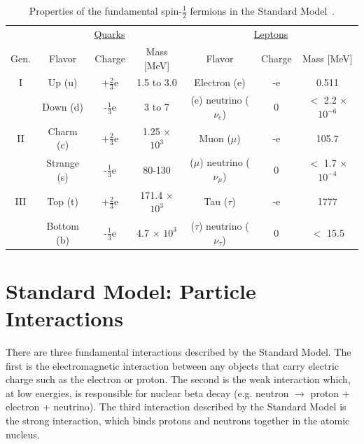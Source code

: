 \begin{table}[!h!tbp]
\begin{center}
\caption{Properties of the fundamental spin-$\frac{1}{2}$ fermions in the Standard Model~\cite{Yao:2006px}.}
\begin{tabular}{c|ccc|ccc}
& \multicolumn{3}{c|}{\underline{Quarks}}
& \multicolumn{3}{c}{\underline{Leptons}} \\
Gen.	&	Flavor	&	Charge	&	Mass [MeV]				&	Flavor					&	Charge	&	Mass [MeV]	\\
\hline
I	&	Up (u)		&	+$\frac{2}{3}$e	&	1.5 to 3.0					&	Electron (e)				&	-e		&	0.511	\\
	&	Down (d)		&	-$\frac{1}{3}$e	&	3 to 7					&	(e) neutrino ($\nu_{e}$)	&	0		&	$<$ 2.2 $\times$ $10^{-6}$	\\
\hline
II	&	Charm (c)		&	+$\frac{2}{3}$e	&	1.25 $\times$ $10^{3}$		&	Muon ($\mu$)				&	-e		&	105.7	\\
	&	Strange (s)	&	-$\frac{1}{3}$e	&	80-130					&	($\mu$) neutrino ($\nu_{\mu}$)	&	0		&	$<$ 1.7 $\times$ $10^{-4}$	\\
\hline
III	&	Top (t)		&	+$\frac{2}{3}$e	&	171.4 $\times$ $10^{3}$		&	Tau ($\tau$)				&	-e		&	1777		\\
	&	Bottom (b)		&	-$\frac{1}{3}$e	&	4.7 $\times$ $10^{3}$		&	($\tau$) neutrino ($\nu_{\tau}$)	&	0		&	$<$ 15.5	\\
\end{tabular}
\vspace{-0.1 in}
\label{fermions}
\end{center}
\end{table}

\section{Standard Model: Particle Interactions}
\label{interaction}

There are three fundamental interactions described by the Standard Model. The first is the electromagnetic interaction between any objects that carry electric charge such as the electron or proton. The second is the weak interaction which, at low energies, is responsible for nuclear beta decay (e.g. neutron $\rightarrow$ proton + electron + neutrino). The third interaction described by the Standard Model is the strong interaction, which binds protons and neutrons together in the atomic nucleus.

